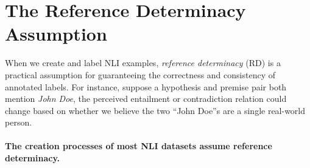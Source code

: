 

\section{The Reference Determinacy Assumption}
\label{ssec:prelim-rd}
When we create and label NLI examples, \textit{reference determinacy} (RD) is a practical assumption for guaranteeing the correctness and consistency of annotated labels. For instance, suppose a hypothesis and premise pair both mention \textit{John Doe}, the perceived entailment or contradiction relation could change based on whether we believe the two ``John Doe''s are a single real-world person. 

\paragraph{The creation processes of most NLI datasets assume reference determinacy.} 

